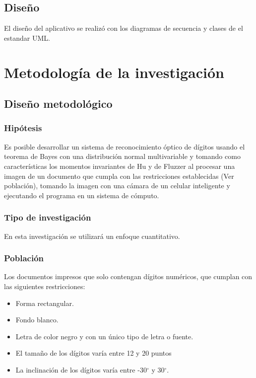 \documentclass[a4paper, 11pt, oneside]{report}
\begin{document}
\section{Diseño}
El diseño del aplicativo se realizó con los diagramas de secuencia y clases de el estandar UML.

\chapter{Metodología de la investigación}
\label{chap:metodology}

\section{Diseño metodológico}

\subsection{Hipótesis}

Es posible desarrollar un sistema de reconocimiento óptico de dígitos usando el teorema de Bayes con una distribución normal multivariable y tomando como características los momentos invariantes de Hu y de Fluzzer al procesar una imagen de un documento que cumpla con las restricciones establecidas (Ver población), tomando la imagen con	una cámara de un celular inteligente y ejecutando el programa en un sistema de cómputo.
	
\subsection{Tipo de investigación}

En esta investigación se utilizará un enfoque cuantitativo.

\subsection{Población}
\label{sect:population}

Los documentos impresos que solo contengan dígitos numéricos, que cumplan con las siguientes restricciones:
\begin{itemize}
\item Forma rectangular.
\item Fondo blanco.
\item Letra de color negro y con un único tipo de letra o fuente.
\item El tamaño de los dígitos varía entre 12 y 20 puntos
\item La inclinación de los dígitos varía entre -30$^{\circ}$ y 30$^{\circ}$.
\end{itemize}
\end{document}
